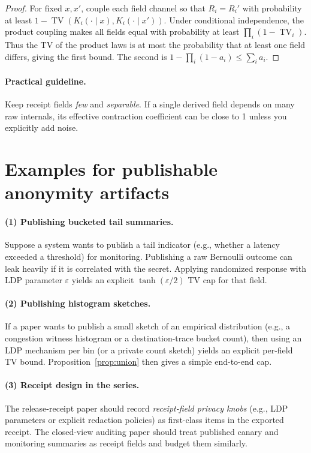 \documentclass[11pt]{article}
\DeclareMathOperator{\TV}{TV}
\begin{document}
\begin{proof}
For fixed $x,x'$, couple each field channel so that $R_i=R_i'$ with probability at least $1-\TV(K_i(\cdot\mid x),K_i(\cdot\mid x'))$.
Under conditional independence, the product coupling makes all fields equal with probability at least $\prod_i (1-\TV_i)$.
Thus the TV of the product laws is at most the probability that at least one field differs, giving the first bound.
The second is $1-\prod_i (1-a_i)\le \sum_i a_i$.
\end{proof}

\paragraph{Practical guideline.}
Keep receipt fields \emph{few} and \emph{separable}.
If a single derived field depends on many raw internals, its effective contraction coefficient can be close to 1 unless you explicitly add noise.

\section{Examples for publishable anonymity artifacts}
\paragraph{(1) Publishing bucketed tail summaries.}
Suppose a system wants to publish a tail indicator (e.g., whether a latency exceeded a threshold) for monitoring.
Publishing a raw Bernoulli outcome can leak heavily if it is correlated with the secret.
Applying randomized response with LDP parameter $\varepsilon$ yields an explicit $\tanh(\varepsilon/2)$ TV cap for that field.

\paragraph{(2) Publishing histogram sketches.}
If a paper wants to publish a small sketch of an empirical distribution (e.g., a congestion witness histogram or a destination-trace bucket count),
then using an LDP mechanism per bin (or a private count sketch) yields an explicit per-field TV bound.
Proposition~\ref{prop:union} then gives a simple end-to-end cap.

\paragraph{(3) Receipt design in the series.}
The release-receipt paper should record \emph{receipt-field privacy knobs} (e.g., LDP parameters or explicit redaction policies) as first-class items in the exported receipt.
The closed-view auditing paper should treat published canary and monitoring summaries as receipt fields and budget them similarly.
\end{document}

